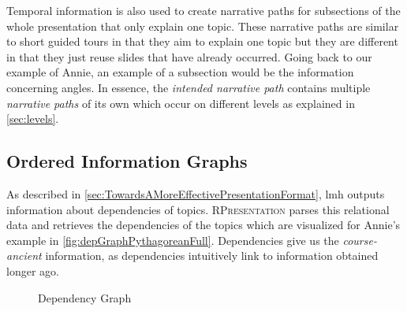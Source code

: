 \documentclass{llncs}
\newcommand{\sys}{\textsc{RPresentation}\xspace}
\begin{document}
Temporal information is also used to create narrative paths for subsections of the whole presentation that only explain one topic. These narrative paths are similar to short guided tours in that they aim to explain one topic but they are different in that they just reuse slides that have already occurred. Going back to our example of Annie, an example of a subsection would be the information concerning angles. In essence, the \textit{intended narrative path} contains multiple \textit{narrative paths} of its own which occur on different levels as explained in \autoref{sec:levels}.

\subsection{Ordered Information Graphs}
\label{sec:orderedInfoGraphs}

As described in \autoref{sec:TowardsAMoreEffectivePresentationFormat}, lmh outputs information about dependencies of topics. \sys parses this relational data and retrieves the dependencies of the topics which are visualized for Annie's example in \autoref{fig:depGraphPythagoreanFull}. Dependencies give us the \textit{course-ancient} information, as dependencies intuitively link to information obtained longer ago.

\begin{figure}[ht]\vspace{-1em}
  \vspace{-.5em}
  \caption{Dependency Graph}\label{fig:depGraphPythagoreanFull}
\end{figure}
\end{document}
